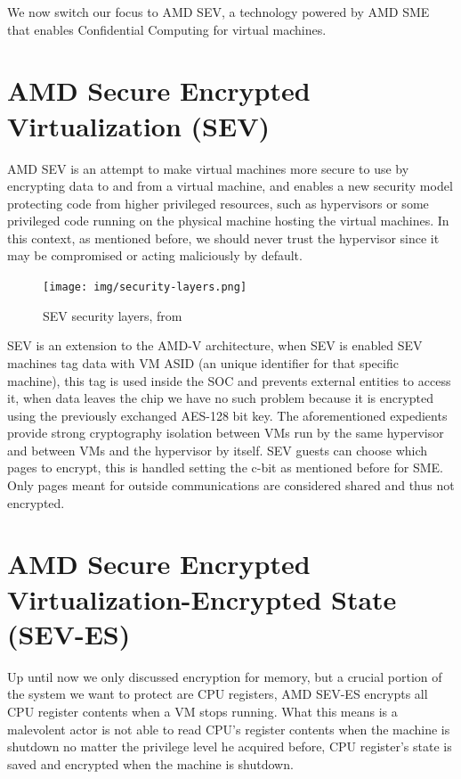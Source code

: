 \documentclass[twocolumn]{article}
\begin{document}
We now switch our focus to AMD SEV, a technology powered by AMD SME that enables Confidential Computing for virtual machines.

\section{AMD Secure Encrypted Virtualization (SEV)}

AMD SEV is an attempt to make virtual machines more secure to use by encrypting data to and from a virtual machine, and enables a new security model protecting code from higher privileged resources, such as hypervisors or some privileged code running on the physical machine hosting the virtual machines. In this context, as mentioned before, we should never trust the hypervisor since it may be compromised or acting maliciously by default.

\begin{figure}
    \centering
    \texttt{[image: img/security-layers.png]}
    \caption{SEV security layers, from \cite{memory-encryption}}
\end{figure}

SEV is an extension to the AMD-V architecture, when SEV is enabled SEV machines tag data with VM ASID (an unique identifier for that specific machine), this tag is used inside the SOC and prevents external entities to access it, when data leaves the chip we have no such problem because it is encrypted using the previously exchanged AES-128 bit key. The aforementioned expedients provide strong cryptography isolation between VMs run by the same hypervisor and between VMs and the hypervisor by itself. SEV guests can choose which pages to encrypt, this is handled setting the c-bit as mentioned before for SME. Only pages meant for outside communications are considered shared and thus not encrypted.

\section{AMD Secure Encrypted Virtualization-Encrypted State (SEV-ES)}

Up until now we only discussed encryption for memory, but a crucial portion of the system we want to protect are CPU registers, AMD SEV-ES encrypts all CPU register contents when a VM stops running. What this means is a malevolent actor is not able to read CPU's register contents when the machine is shutdown no matter the privilege level he acquired before, CPU register's state is saved and encrypted when the machine is shutdown.
\end{document}
